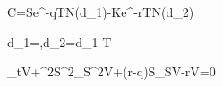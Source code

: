 C=Se^{-qT}N(d_1)-Ke^{-rT}N(d_2)

d_1=,\qquad d_2=d_1-\sigma\sqrt T

\partial_tV+\sigma^2S^2\partial_S^2V+(r-q)S\partial_SV-rV=0
